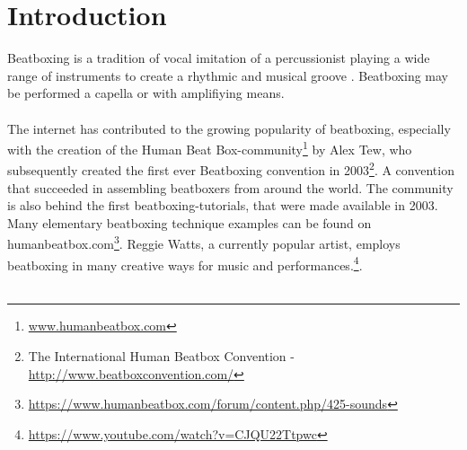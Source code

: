\section{ Introduction }
Beatboxing is a tradition of vocal imitation of a percussionist playing a wide range of instruments to create a rhythmic and musical groove \citep{Stowell2008}. 
Beatboxing may be performed a capella or with amplifiying means\citep{Stowell2008}. \\\\The internet has contributed to the growing popularity of beatboxing, especially with the creation of the Human Beat Box-community\footnote{\url{www.humanbeatbox.com}} by Alex Tew, who subsequently created the first ever Beatboxing convention in 2003\footnote{The International Human Beatbox Convention - \url{http://www.beatboxconvention.com/}}. A convention that succeeded in assembling beatboxers from around the world. The community is also behind the first beatboxing-tutorials, that were made available in 2003. Many elementary beatboxing technique examples can be found on humanbeatbox.com\footnote{\url{https://www.humanbeatbox.com/forum/content.php/425-sounds}}. Reggie Watts, a currently popular artist, employs beatboxing in many creative ways for music and performances.\footnote{\url{https://www.youtube.com/watch?v=CJQU22Ttpwc}}. \\\\

